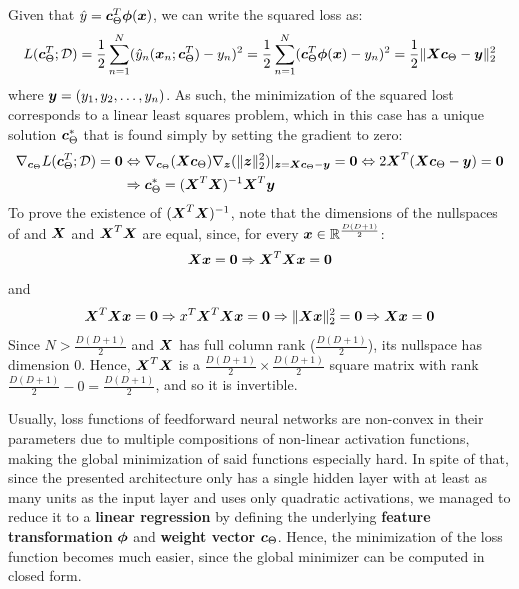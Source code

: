 \begin{questions}
        \question
        Given that $\hat{y} = \vb*{c}^T_{\Theta} \vb*{\phi}(\vb*{x})$, we can write the squared loss as:
        \[
            L(\vb*{c}^T_{\Theta}; \mathcal{D}) = \frac{1}{2} \sum_{n = 1}^{N} (\hat{y}_n(\vb*{x}_n; \vb*{c}^T_{\Theta}) - y_n) ^2 = \frac{1}{2} \sum_{n = 1}^{N} (\vb*{c}^T_{\Theta} \vb*{\phi}(\vb*{x}) - y_n) ^2 = \frac{1}{2} \|\vb*{X}\vb*{c}_{\Theta} - \vb*{y} \|_2^2
        \]
        where $\vb*{y} = (y_1, y_2, \dots, y_n)$. As such, the minimization of the squared lost corresponds to a linear least squares problem, which in this case has a unique solution $\vb*{c}^*_{\Theta}$ that is found simply by setting the gradient to zero:
        \begin{align*}
            \nabla_{\vb*{c}_{\Theta}} L(\vb*{c}^T_{\Theta}; \mathcal{D}) = \vb*{0} &\Leftrightarrow \nabla_{\vb*{c}_{\Theta}}(\vb*{X}\vb*{c}_{\Theta}) \nabla_{\vb*{z}}(\|\vb*{z}\|_2^2) \rvert_{\vb*{z} = \vb*{X}\vb*{c}_{\Theta} - \vb*{y}} = \vb*{0} \Leftrightarrow 2\vb*{X}^T(\vb*{X}\vb*{c}_{\Theta} - \vb*{y}) = \vb*{0} \\
            &\Rightarrow \vb*{c}^*_{\Theta} = (\vb*{X}^T\vb*{X})^{-1}\vb*{X}^T\vb*{y}
        \end{align*}
        To prove the existence of $ (\vb*{X}^T\vb*{X})^{-1}$, note that the dimensions of the nullspaces of and $\vb*{X}$ and $\vb*{X}^T\vb*{X}$ are equal, since, for every $\vb*{x} \in \mathbb{R}^{\frac{D(D + 1)}{2}}$:
        \[
            \vb*{X}\vb*{x} = \vb*{0} \Rightarrow \vb*{X}^T\vb*{X}\vb*{x} = \vb*{0}
        \]
        and 
        \[
            \vb*{X}^T\vb*{X}\vb*{x} = \vb*{0} \Rightarrow x^T\vb*{X}^T\vb*{X}\vb*{x} = \vb*{0} 
            \Rightarrow \|\vb*{X}\vb*{x}\|_2^2 = \vb*{0} \Rightarrow \vb*{X}\vb*{x} = \vb*{0}
        \]
        Since $N > \frac{D(D + 1)}{2}$ and $\vb*{X}$ has full column rank ($\frac{D(D + 1)}{2}$), its nullspace has dimension $0$. Hence, $\vb*{X}^T\vb*{X}$ is a $\frac{D(D + 1)}{2} \times \frac{D(D + 1)}{2}$ square matrix with rank $\frac{D(D + 1)}{2} - 0 = \frac{D(D + 1)}{2}$, and so it is invertible. \par
        Usually, loss functions of feedforward neural networks are non-convex in their parameters due to multiple compositions of non-linear activation functions, making the global minimization of said functions especially hard. In spite of that, since the presented architecture only has a single hidden layer with at least as many units as the input layer and uses only quadratic activations, we managed to reduce it to a \textbf{linear regression} by defining the underlying \textbf{feature transformation} $\vb*{\phi}$ and \textbf{weight vector} $\vb*{c}_{\Theta}$. Hence, the minimization of the loss function becomes much easier, since the global minimizer can be computed in closed form.
    \end{questions}
